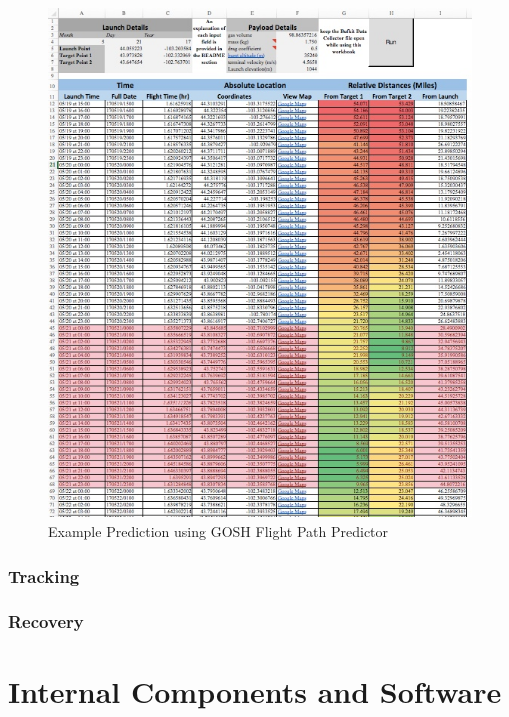 \documentclass[english]{report}
\begin{document}
\begin{figure}[H]
\begin{centering}
\includegraphics[scale=0.4]{./images/GOSH}
\par\end{centering}
\label{fig:GOSH}
\caption{Example Prediction using GOSH Flight Path Predictor}
\end{figure}

\section{Tracking}
\label{sec:tracking}

\section{Recovery}
\label{sec:recovery}



\part{Internal Components and Software}
\label{internal_components}
\end{document}
